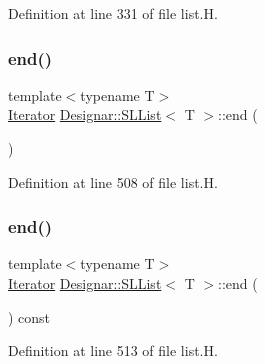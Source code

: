 Definition at line 331 of file list.\+H.

\mbox{\label{class_designar_1_1_s_l_list_a1fc18a918d23fd61767c2bf2f10f25b6}} 
\subsubsection{\texorpdfstring{end()}{end()}\hspace{0.1cm}{\footnotesize\ttfamily [1/2]}}
{\footnotesize\ttfamily template$<$typename T$>$ \\
\hyperlink{class_designar_1_1_s_l_list_1_1_iterator}{Iterator} \hyperlink{class_designar_1_1_s_l_list}{Designar\+::\+S\+L\+List}$<$ T $>$\+::end (\begin{DoxyParamCaption}{ }\end{DoxyParamCaption})\hspace{0.3cm}{\ttfamily [inline]}}



Definition at line 508 of file list.\+H.

\mbox{\label{class_designar_1_1_s_l_list_abeb2f9568d658b5da8831e7d993de353}} 
\subsubsection{\texorpdfstring{end()}{end()}\hspace{0.1cm}{\footnotesize\ttfamily [2/2]}}
{\footnotesize\ttfamily template$<$typename T$>$ \\
\hyperlink{class_designar_1_1_s_l_list_1_1_iterator}{Iterator} \hyperlink{class_designar_1_1_s_l_list}{Designar\+::\+S\+L\+List}$<$ T $>$\+::end (\begin{DoxyParamCaption}{ }\end{DoxyParamCaption}) const\hspace{0.3cm}{\ttfamily [inline]}}



Definition at line 513 of file list.\+H.

\mbox{\label{class_designar_1_1_s_l_list_ab4e0f44fe834563d47f36aab670b8c83}} 
